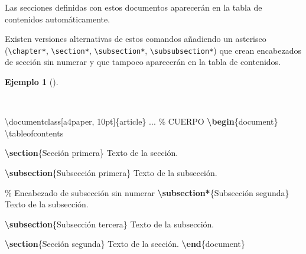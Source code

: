 \documentclass[
  a4paper,
]{scrreport}
\newenvironment{Shaded}{\begin{snugshade}}{\end{snugshade}}
\newcommand{\BuiltInTok}[1]{\textcolor[rgb]{0.00,0.23,0.31}{#1}}
\newcommand{\CommentTok}[1]{\textcolor[rgb]{0.37,0.37,0.37}{#1}}
\newcommand{\ExtensionTok}[1]{\textcolor[rgb]{0.00,0.23,0.31}{#1}}
\newcommand{\FunctionTok}[1]{\textcolor[rgb]{0.28,0.35,0.67}{#1}}
\newcommand{\KeywordTok}[1]{\textcolor[rgb]{0.00,0.23,0.31}{\textbf{#1}}}
\newcommand{\NormalTok}[1]{\textcolor[rgb]{0.00,0.23,0.31}{#1}}
\theoremstyle{definition}
\newtheorem{example}{Ejemplo}[chapter]
\theoremstyle{remark}
\begin{document}
Las secciones definidas con estos documentos aparecerán en la tabla de
contenidos automáticamente.

Existen versiones alternativas de estos comandos añadiendo un asterisco
(\texttt{\textbackslash{}chapter*}, \texttt{\textbackslash{}section*},
\texttt{\textbackslash{}subsection*},
\texttt{\textbackslash{}subsubsection*}) que crean encabezados de
sección sin numerar y que tampoco aparecerán en la tabla de contenidos.

\begin{example}[]\protect\hypertarget{exm-secciones}{}\label{exm-secciones}

~

\begin{Shaded}
\begin{Highlighting}[]
\BuiltInTok{\textbackslash{}documentclass}\NormalTok{[a4paper, 10pt]\{}\ExtensionTok{article}\NormalTok{\}}
\NormalTok{...}
\CommentTok{\% CUERPO}
\KeywordTok{\textbackslash{}begin}\NormalTok{\{}\ExtensionTok{document}\NormalTok{\}}
\FunctionTok{\textbackslash{}tableofcontents}

\KeywordTok{\textbackslash{}section}\NormalTok{\{Sección primera\}}
\NormalTok{Texto de la sección.}

\KeywordTok{\textbackslash{}subsection}\NormalTok{\{Subsección primera\}}
\NormalTok{Texto de la subsección.}

\CommentTok{\% Encabezado de subsección sin numerar}
\KeywordTok{\textbackslash{}subsection*}\NormalTok{\{Subsección segunda\}}
\NormalTok{Texto de la subsección.}

\KeywordTok{\textbackslash{}subsection}\NormalTok{\{Subsección tercera\}}
\NormalTok{Texto de la subsección.}

\KeywordTok{\textbackslash{}section}\NormalTok{\{Sección segunda\}}
\NormalTok{Texto de la sección.}
\KeywordTok{\textbackslash{}end}\NormalTok{\{}\ExtensionTok{document}\NormalTok{\}}
\end{Highlighting}
\end{Shaded}

\begin{tcolorbox}[enhanced jigsaw, colframe=quarto-callout-note-color-frame, opacityback=0, title={Salida}, bottomrule=.15mm, left=2mm, coltitle=black, arc=.35mm, leftrule=.75mm, colback=white, rightrule=.15mm, colbacktitle=quarto-callout-note-color!10!white, toprule=.15mm, breakable, opacitybacktitle=0.6, bottomtitle=1mm, toptitle=1mm, titlerule=0mm]


\end{tcolorbox}
\end{example}
\end{document}
